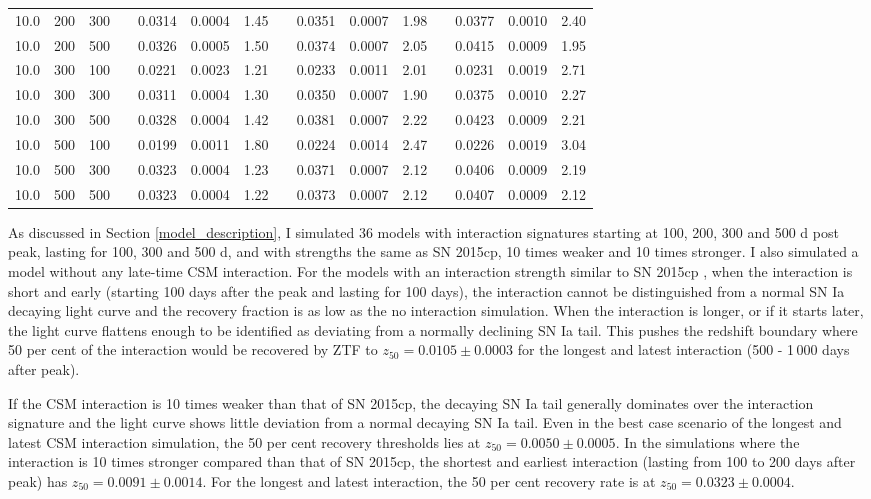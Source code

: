 \documentclass[a4paper,oneside,12pt, class=Latex/Classes/PhDthesisPSnPDF, crop=false]{standalone}
\begin{document}
\begin{table}
{\begin{tabular}{cccclcrclcrclcr}
  10.0 & 200 & 300 && 0.0314 & 0.0004 & 1.45 && 0.0351 & 0.0007 & 1.98 && 0.0377 & 0.0010 & 2.40\\
  10.0 & 200 & 500 && 0.0326 & 0.0005 & 1.50 && 0.0374 & 0.0007 & 2.05 && 0.0415 & 0.0009 & 1.95\\
  10.0 & 300 & 100 && 0.0221 & 0.0023 & 1.21 && 0.0233 & 0.0011 & 2.01 && 0.0231 & 0.0019 & 2.71\\
  10.0 & 300 & 300 && 0.0311 & 0.0004 & 1.30 && 0.0350 & 0.0007 & 1.90 && 0.0375 & 0.0010 & 2.27\\
  10.0 & 300 & 500 && 0.0328 & 0.0004 & 1.42 && 0.0381 & 0.0007 & 2.22 && 0.0423 & 0.0009 & 2.21\\
  10.0 & 500 & 100 && 0.0199 & 0.0011 & 1.80 && 0.0224 & 0.0014 & 2.47 && 0.0226 & 0.0019 & 3.04\\
  10.0 & 500 & 300 && 0.0323 & 0.0004 & 1.23 && 0.0371 & 0.0007 & 2.12 && 0.0406 & 0.0009 & 2.19\\
  10.0 & 500 & 500 && 0.0323 & 0.0004 & 1.22 && 0.0373 & 0.0007 & 2.12 && 0.0407 & 0.0009 & 2.12\\
  \hline
 \end{tabular}
 }
 \label{sim_z50_results}
\end{table}

 As discussed in Section \ref{model_description}, I simulated 36 models with interaction signatures starting at 100, 200, 300 and 500 d post peak, lasting for 100, 300 and 500 d, and with strengths the same as SN 2015cp, 10 times weaker and 10 times stronger. I also simulated a model without any late-time CSM interaction. For the models with an interaction strength similar to SN 2015cp \citep{2015cp}, when the interaction is short and early (starting 100 days after the peak and lasting for 100 days), the interaction cannot be distinguished from a normal SN Ia decaying light curve and the recovery fraction is as low as the no interaction simulation. When the interaction is longer, or if it starts later, the light curve flattens enough to be identified as deviating from a normally declining SN Ia tail. This pushes the redshift boundary where 50 per cent of the interaction would be recovered by ZTF to $z_{50} = 0.0105 \pm 0.0003$ for the longest and latest interaction (500 - 1\,000 days after peak).

If the CSM interaction is 10 times weaker than that of SN 2015cp, the decaying SN Ia tail generally dominates over the interaction signature and the light curve shows little deviation from a normal decaying SN Ia tail. Even in the best case scenario of the longest and latest CSM interaction simulation, the 50 per cent recovery thresholds lies at $z_{50} = 0.0050 \pm 0.0005$. In the simulations where the interaction is 10 times stronger compared than that of SN 2015cp, the shortest and earliest interaction (lasting from 100 to 200 days after peak) has $z_{50} = 0.0091 \pm 0.0014$. For the longest and latest interaction, the 50 per cent recovery rate is at $z_{50} = 0.0323 \pm 0.0004$.
\end{document}
